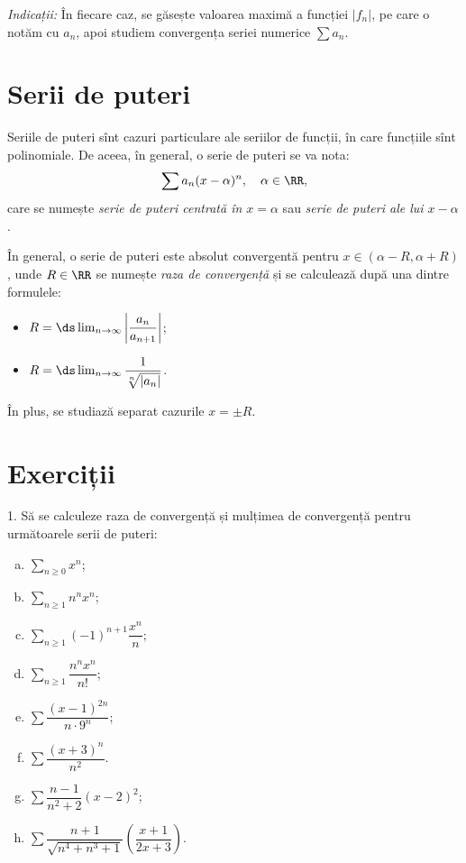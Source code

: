 \emph{Indicații:} În fiecare caz, se găsește valoarea maximă a funcției $ | f_n | $,
pe care o notăm cu $ a_n $, apoi studiem convergența seriei numerice $ \sum a_n $.

\section{Serii de puteri}

Seriile de puteri sînt cazuri particulare ale
seriilor de funcții, în care funcțiile sînt polinomiale. De aceea, în general,
o serie de puteri se va nota:
\[
  \sum a_n (x - \alpha)^n, \quad \alpha \in \RR,
\]
care se numește \emph{serie de puteri centrată în $ x = \alpha $} sau
\emph{serie de puteri ale lui $ x - \alpha $}.

În general, o serie de puteri este absolut convergentă pentru $ x \in (\alpha - R, \alpha + R) $, unde
$ R \in \RR $ se numește \emph{raza de convergență} și se calculează după una dintre
formulele:
\begin{itemize}
\item $ R = \ds\lim_{n \to \infty} \left| \dfrac{a_n}{a_{n+1}} \right| $;
\item $ R = \ds\lim_{n \to \infty} \dfrac{1}{\sqrt[n]{|a_n|}} $.
\end{itemize}

În plus, se studiază separat cazurile $ x = \pm R $.

\section{Exerciții}

1. Să se calculeze raza de convergență și mulțimea de convergență pentru
următoarele serii de puteri:
\begin{enumerate}[(a)]
\item $ \sum_{n \geq 0} x^n $;
\item $ \sum_{n \geq 1} n^n x^n $;
\item $ \sum_{n \geq 1} (-1)^{n+1} \dfrac{x^n}{n} $;
\item $ \sum_{n \geq 1} \dfrac{n^nx^n}{n!} $;
\item $ \sum \dfrac{(x - 1)^{2n}}{n \cdot 9^n} $;
\item $ \sum \dfrac{(x + 3)^n}{n^2} $.
\item $ \sum \dfrac{n - 1}{n^2 + 2} (x - 2)^2 $;
\item $ \sum \dfrac{n + 1}{\sqrt{n^4 + n^3 + 1}} \left( \dfrac{x + 1}{2x + 3} \right) $.
\end{enumerate}

